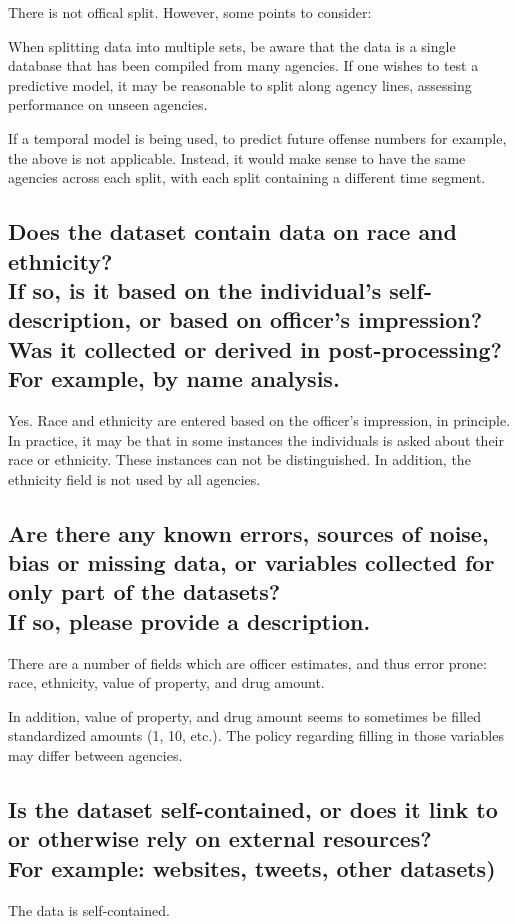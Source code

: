 \documentclass[letterpaper, 10 pt, conference]{ieeeconf}  %
\newcommand{\subtitle}[1]{{\\ \small \normalfont \color{purple} #1}}
\begin{document}
There is not offical split. However, some points to consider: 

When splitting data into multiple sets, be aware that the data is a single database that has been compiled from many agencies. If one wishes to test a predictive model, it may be reasonable to split along agency lines, assessing performance on unseen agencies. 

If a temporal model is being used, to predict future offense numbers for example, the above is not applicable. Instead, it would make sense to have the same agencies across each split, with each split containing a different time segment. 

\subsection{Does the dataset contain data on race and ethnicity? \subtitle{If so, is it based on the individual's self-description, or based on officer's impression? Was it collected or derived in post-processing? For example, by name analysis.}}

Yes. Race and ethnicity are entered based on the officer's impression, in principle. In practice, it may be that in some instances the individuals is asked about their race or ethnicity. These instances can not be distinguished. In addition, the ethnicity field is not used by all agencies. 
\subsection{Are there any known errors, sources of noise, bias or missing data, or variables collected for only part of the datasets? \subtitle{If so, please provide a description.}}

There are a number of fields which are officer estimates, and thus error prone: race, ethnicity, value of property, and drug amount.

In addition, value of property, and drug amount seems to sometimes be filled standardized amounts (1, 10, etc.). The policy regarding filling in those variables may differ between agencies. 

\subsection{Is the dataset self-contained, or does it link to or otherwise rely on external resources? \subtitle{For example: websites, tweets, other datasets)}}

The data is self-contained.
\end{document}
